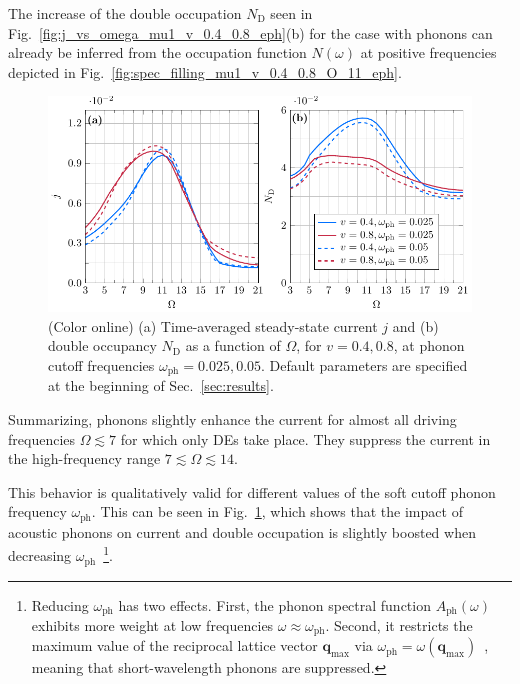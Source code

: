 \documentclass[aps,prb,groupedaddress,showpacs,twocolumn,superscriptaddress,10pt]{revtex4-2}
\renewcommand{\vec}[1]{\bm{#1}} %
\begin{document}
The increase of the double occupation $N_{\text{D}}$ seen in Fig.~\ref{fig:j_vs_omega_mu1_v_0.4_0.8_eph}(b) for the case with phonons can already be inferred from the occupation function $N(\omega)$ at positive frequencies depicted in Fig.~\ref{fig:spec_filling_mu1_v_0.4_0.8_O_11_eph}.

 
\begin{figure}[t] 
\includegraphics[width=\linewidth]{./figures_Paper1/j_vs_omega_mu1_v_0.4_0.8_E0_2_sweep_omegaph.pdf}
\caption{(Color online) (a) Time-averaged steady-state current $j$ and (b) double occupancy $N_{\text{D}}$ as a function of $\Omega$, for $v=0.4, 0.8$, at phonon cutoff frequencies $\omega_{\text{ph}}=0.025, 0.05$. Default parameters are specified at the beginning of Sec.~\ref{sec:results}.} 
\label{fig:j_vs_omega_mu1_v_0.4_0.8_E0_2_sweep_omegaph}
\end{figure}


Summarizing, phonons
slightly
enhance the current for almost all driving frequencies $\Omega\lesssim 7$ for which only DEs take place. They suppress the current in the high-frequency range $7\lesssim\Omega\lesssim14$.

This behavior is qualitatively valid for different values of the soft cutoff phonon frequency
 $\omega_{\text{ph}}$. This can be seen in Fig.~\ref{fig:j_vs_omega_mu1_v_0.4_0.8_E0_2_sweep_omegaph}, which shows that the impact of acoustic phonons on 
current and double occupation is slightly boosted when decreasing $\omega_{\text{ph}}$~\footnote{Reducing $\omega_{\text{ph}}$ has two effects. First, the phonon spectral function $A_{\text{ph}}(\omega)$ exhibits more weight at low frequencies $\omega\approx\omega_{\text{ph}}$. Second, it restricts the maximum value of the reciprocal lattice vector $\vec{q}_{\text{max}}$ via $\omega_{\text{ph}}=\omega(\vec{q}_{\text{max}})$~\cite{ma.ga.22u}, meaning that short-wavelength phonons are suppressed.}. 
    
\end{document}

